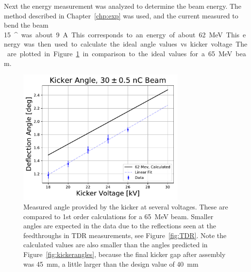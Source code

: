 Next the energy measurement was analyzed to determine the beam energy. 
The method described in Chapter~\ref{chp:exp} was used, 
and the current measured to bend the beam \SI{15}{^\circ} was about \SI{9}{A}.
This corresponds to an energy of about \SI{62}{MeV}. 
This energy was then used to calculate the ideal angle values vs. kicker voltage.
The are plotted in Figure~\ref{fig:angles} in comparison 
to the ideal values for a \SI{65}{MeV} beam. 
\begin{figure}
	\centering
	\includegraphics[width=0.75\textwidth]{./images/kicker_angle_comparison}
	\caption{Measured angle provided by the kicker at several voltages.  
	These are compared to 1st order calculations for a \SI{65}{MeV} beam.
	Smaller angles are expected in the data due to the reflections
	seen at the feedthroughs in TDR measurements, see Figure~\ref{fig:TDR}.
	Note the calculated values are also smaller than the 
	angles predicted in Figure~\ref{fig:kickerangles}, 
	because the final kicker gap after assembly was \SI{45}{mm}, a little larger
	than the design value of \SI{40}{mm}}
	\label{fig:angles}
\end{figure}

